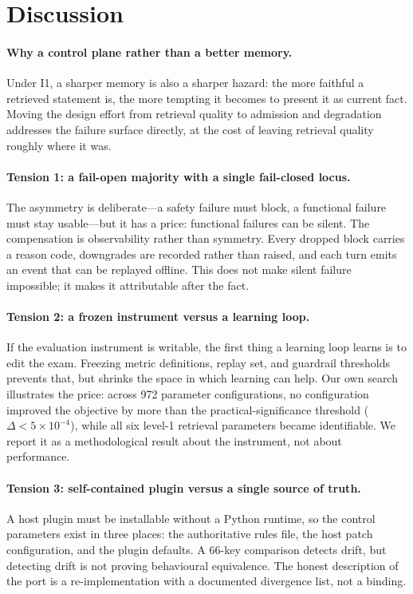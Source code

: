 \section{Discussion}\label{sec:discussion}

\paragraph{Why a control plane rather than a better memory.} Under I1, a
sharper memory is also a sharper hazard: the more faithful a retrieved statement
is, the more tempting it becomes to present it as current fact. Moving the
design effort from retrieval quality to admission and degradation addresses the
failure surface directly, at the cost of leaving retrieval quality roughly where
it was.

\paragraph{Tension 1: a fail-open majority with a single fail-closed locus.}
The asymmetry is deliberate---a safety failure must block, a functional failure
must stay usable---but it has a price: functional failures can be silent. The
compensation is observability rather than symmetry. Every dropped block carries
a reason code, downgrades are recorded rather than raised, and each turn emits
an event that can be replayed offline. This does not make silent failure
impossible; it makes it attributable after the fact.

\paragraph{Tension 2: a frozen instrument versus a learning loop.} If the
evaluation instrument is writable, the first thing a learning loop learns is to
edit the exam. Freezing metric definitions, replay set, and guardrail thresholds
prevents that, but shrinks the space in which learning can help. Our own search
illustrates the price: across 972 parameter configurations, no configuration
improved the objective by more than the practical-significance threshold
($\Delta < 5\times10^{-4}$), while all six level-1 retrieval parameters became
identifiable. We report it as a methodological result about the instrument, not
about performance.

\paragraph{Tension 3: self-contained plugin versus a single source of truth.} A
host plugin must be installable without a Python runtime, so the control
parameters exist in three places: the authoritative rules file, the host patch
configuration, and the plugin defaults. A 66-key comparison detects drift, but
detecting drift is not proving behavioural equivalence. The honest description
of the port is a re-implementation with a documented divergence list, not a
binding.

